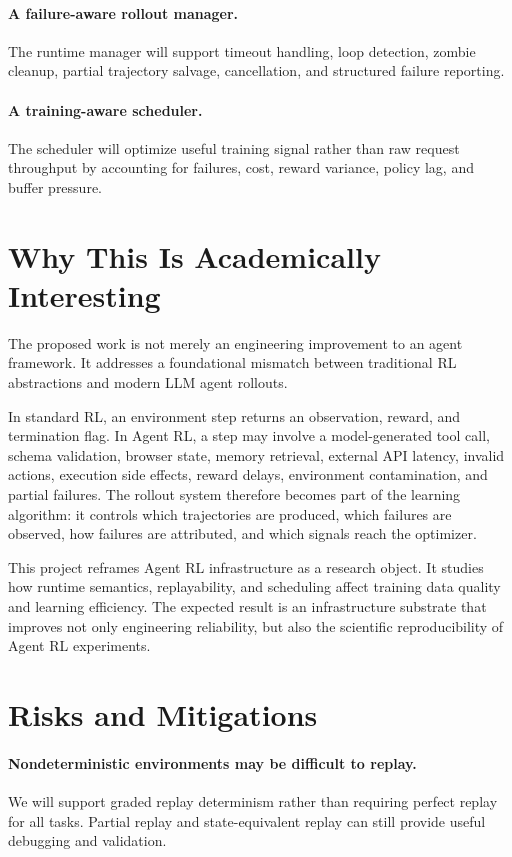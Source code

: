 \documentclass[11pt]{article}
\begin{document}
\paragraph{A failure-aware rollout manager.}
The runtime manager will support timeout handling, loop detection, zombie cleanup, partial trajectory salvage, cancellation, and structured failure reporting.

\paragraph{A training-aware scheduler.}
The scheduler will optimize useful training signal rather than raw request throughput by accounting for failures, cost, reward variance, policy lag, and buffer pressure.

\section{Why This Is Academically Interesting}

The proposed work is not merely an engineering improvement to an agent framework.
It addresses a foundational mismatch between traditional RL abstractions and modern LLM agent rollouts.

In standard RL, an environment step returns an observation, reward, and termination flag.
In Agent RL, a step may involve a model-generated tool call, schema validation, browser state, memory retrieval, external API latency, invalid actions, execution side effects, reward delays, environment contamination, and partial failures.
The rollout system therefore becomes part of the learning algorithm: it controls which trajectories are produced, which failures are observed, how failures are attributed, and which signals reach the optimizer.

This project reframes Agent RL infrastructure as a research object.
It studies how runtime semantics, replayability, and scheduling affect training data quality and learning efficiency.
The expected result is an infrastructure substrate that improves not only engineering reliability, but also the scientific reproducibility of Agent RL experiments.

\section{Risks and Mitigations}

\paragraph{Nondeterministic environments may be difficult to replay.}
We will support graded replay determinism rather than requiring perfect replay for all tasks.
Partial replay and state-equivalent replay can still provide useful debugging and validation.
\end{document}
